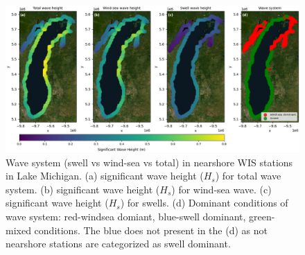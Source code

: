 \begin{figure}[htbp]
  \centering
  \includegraphics[width=1\textwidth]{chapter4/resources/nearshore_system_climate.png}
  \caption{Wave system (swell vs wind-sea vs total) in nearshore WIS stations in
  Lake Michigan. (a) significant wave height ($H_s$) for total wave system. (b)
  significant wave height ($H_s$) for wind-sea wave. (c) significant wave height
  ($H_s$) for swells. (d) Dominant conditions of wave system: red-windsea
  domiant, blue-swell dominant, green-mixed conditions. The blue does not
  present in the (d) as not nearshore stations are categorized as swell
  dominant.}
  \label{fig:nearshore_system}
\end{figure}

